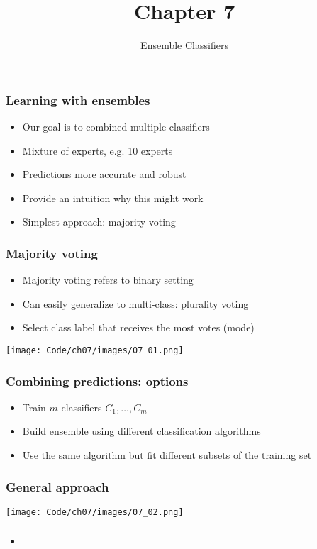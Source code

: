 \documentclass{beamer}
\title{Chapter 7}
\subtitle{Ensemble Classifiers}
\begin{document}
\maketitle

\begin{frame}
  \frametitle{Learning with ensembles}
  \begin{itemize}
  \item Our goal is to combined multiple classifiers
  \item Mixture of experts, e.g. 10 experts
  \item Predictions more accurate and robust
  \item Provide an intuition why this might work
  \item Simplest approach: majority voting
  \end{itemize}
\end{frame}

\begin{frame}
  \frametitle{Majority voting}
  \begin{itemize}
  \item Majority voting refers to binary setting
  \item Can easily generalize to multi-class: plurality voting
  \item Select class label that receives the most votes (mode)
  \end{itemize}
  \vspace{0.2in}
  \center
  \texttt{[image: Code/ch07/images/07\_01.png]}
\end{frame}

\begin{frame}
  \frametitle{Combining predictions: options}
  \begin{itemize}
  \item Train $m$ classifiers $C_1,\dots,C_m$
  \item Build ensemble using different classification algorithms
  \item Use the same algorithm but fit different subsets of the training set
  \end{itemize}
\end{frame}

\begin{frame}
  \frametitle{General approach}
  \center
  \texttt{[image: Code/ch07/images/07\_02.png]}
\end{frame}

\begin{frame}
  \frametitle{}
  \begin{itemize}
  \item 
  \end{itemize}
\end{frame}
\end{document}
